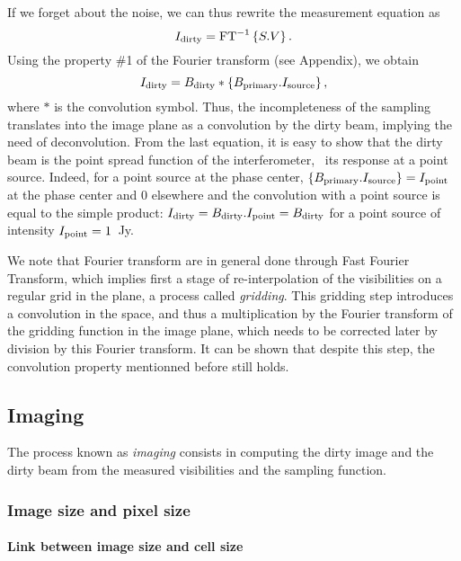 If we forget about the noise, we can thus rewrite the measurement equation
as
\begin{equation}
  I_{\mathrm{dirty}} = \mbox{FT}^{-1} \displaystyle\left\{ S.V \right\}.
\end{equation}
Using the property \#1 of the Fourier transform (see Appendix), we obtain
\begin{equation}
  I_{\mathrm{dirty}} = B_{\mathrm{dirty}} \ast \displaystyle\left\{ B_{\mathrm{primary}}.I_{\mathrm{source}} \right\},
\end{equation}
where $\ast$ is the convolution symbol. Thus, the incompleteness of the
\uv{} sampling translates into the image plane as a convolution by the dirty
beam, implying the need of deconvolution. From the last equation, it is
easy to show that the dirty beam is the point spread function of the
interferometer, \ie\ its response at a point source. Indeed, for a point
source at the phase center, $\displaystyle\left\{ B_{\mathrm{primary}}.I_{\mathrm{source}} \right\} =
I_{\mathrm{point}}$ at the phase center and 0 elsewhere and the convolution with
a point source is equal to the simple product: $I_{\mathrm{dirty}} =
B_{\mathrm{dirty}}.I_{\mathrm{point}} = B_{\mathrm{dirty}}$ for a point source of
intensity $I_{\mathrm{point}} = 1$~Jy.

We note that Fourier transform are in general done through Fast Fourier 
Transform, which implies first a stage of re-interpolation of the 
visibilities on a regular grid in the \uv{} plane, a process called 
\textit{gridding}. This gridding step introduces a convolution in the 
\uv{} space, and thus a multiplication by the Fourier transform of the 
gridding function in the image plane, which needs to be corrected
later by division by this Fourier transform. It can be shown that despite this 
step, the convolution property mentionned before still holds.
 
\subsection{Imaging}
\label{sub:single:imaging}

The process known as {\it imaging} consists in computing the dirty image
and the dirty beam from the measured visibilities and the sampling
function. 

\subsubsection{Image size and pixel size}


\paragraph{Link between image size and \uv{} cell size}

